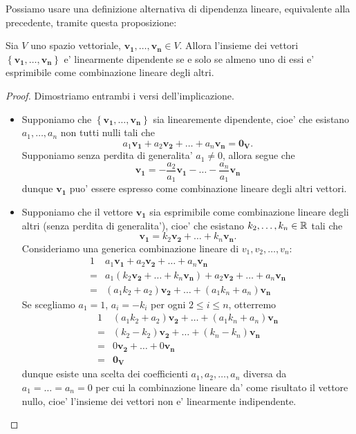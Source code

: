 Possiamo usare una definizione alternativa di dipendenza lineare, equivalente alla precedente, tramite questa proposizione:
\begin{proposition}\label{dip_se_e'_comb_lin}
    Sia $V$ uno spazio vettoriale, $\bm{v_1}, \dots, \bm{v_n} \in V$. Allora l'insieme dei vettori $\left\{ \bm{v_1}, \dots, \bm{v_n} \right\}$ e' linearmente dipendente se e solo se almeno uno di essi e' esprimibile come combinazione lineare degli altri. 
\end{proposition}
\begin{proof}
    Dimostriamo entrambi i versi dell'implicazione.
    \begin{itemize}
        \item Supponiamo che $\left\{ \bm{v_1}, \dots, \bm{v_n} \right\}$ sia linearemente dipendente, cioe' che esistano $a_1, \dots, a_n$ non tutti nulli tali che \[
            a_1\bm{v_1} + a_2\bm{v_2} + \dots + a_n\bm{v_n} = \bm{0_V}   
        .\]
        Supponiamo senza perdita di generalita' $a_1 \neq 0$, allora segue che \[
            \bm{v_1} = -\frac{a_2}{a_1}\bm{v_1} - \dots - \frac{a_n}{a_1}\bm{v_n}
        \]
        dunque $\bm{v_1}$ puo' essere espresso come combinazione lineare degli altri vettori.
        \item Supponiamo che il vettore $\bm{v_1}$ sia esprimibile come combinazione lineare degli altri (senza perdita di generalita'), cioe' che esistano $k_2, \dots, k_n \in \mathbb{R}$ tali che \[
            \bm{v_1} = k_2\bm{v_2} + \dots + k_n\bm{v_n}
        .\]
        Consideriamo una generica combinazione lineare di $v_1, v_2, \dots, v_n$:
        \begin{alignat*}
            {1}
            & a_1\bm{v_1} + a_2\bm{v_2} + \dots + a_n\bm{v_n} \\
            = & a_1(k_2\bm{v_2} + \dots + k_n\bm{v_n}) + a_2\bm{v_2} + \dots + a_n\bm{v_n} \\
            = & (a_1k_2 + a_2)\bm{v_2} + \dots + (a_1k_n + a_n)\bm{v_n}
        \end{alignat*}
        Se scegliamo $a_1 =1$, $a_i = -k_i$ per ogni $2 \leq i \leq n$, otterremo
        \begin{alignat*}{1}
            & (a_1k_2 + a_2)\bm{v_2} + \dots + (a_1k_n + a_n)\bm{v_n} \\
            = & (k_2 - k_2)\bm{v_2} + \dots + (k_n - k_n)\bm{v_n} \\
            = & 0\bm{v_2} + \dots + 0\bm{v_n} \\
            = & \bm{0_V}
        \end{alignat*}
        dunque esiste una scelta dei coefficienti $a_1, a_2, \dots, a_n$ diversa da $a_1 = \dots = a_n = 0$ per cui la combinazione lineare da' come risultato il vettore nullo, cioe' l'insieme dei vettori non e' linearmente indipendente. \qedhere
    \end{itemize}
\end{proof}

